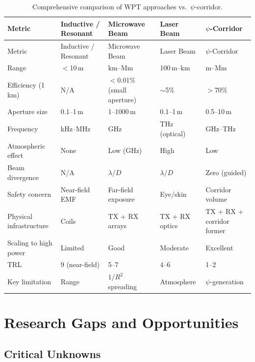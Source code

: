 \documentclass[11pt,a4paper]{article}
\begin{document}
\begin{longtable}{p{2.5cm}p{3cm}p{3cm}p{3cm}p{2cm}}
\caption{Comprehensive comparison of WPT approaches vs.\ $\psi$-corridor.} \\
\toprule
Metric & Inductive / Resonant & Microwave Beam & Laser Beam & $\psi$-Corridor \\
\midrule
\endfirsthead
\toprule
Metric & Inductive / Resonant & Microwave Beam & Laser Beam & $\psi$-Corridor \\
\midrule
\endhead
\bottomrule
\endlastfoot
Range & $<$10\,m & km--Mm & 100\,m--km & m--Mm \\
Efficiency (1\,km) & N/A & $<$0.01\% (small aperture) & $\sim$5\% & $>$70\% \\
Aperture size & 0.1--1\,m & 1--1000\,m & 0.1--1\,m & 0.5--10\,m \\
Frequency & kHz--MHz & GHz & THz (optical) & GHz--THz \\
Atmospheric effect & None & Low (GHz) & High & Low \\
Beam divergence & N/A & $\lambda/D$ & $\lambda/D$ & Zero (guided) \\
Safety concern & Near-field EMF & Far-field exposure & Eye/skin & Corridor volume \\
Physical infrastructure & Coils & TX + RX arrays & TX + RX optics & TX + RX + corridor former \\
Scaling to high power & Limited & Good & Moderate & Excellent \\
TRL & 9 (near-field) & 5--7 & 4--6 & 1--2 \\
Key limitation & Range & $1/R^2$ spreading & Atmosphere & $\psi$-generation \\
\end{longtable}

\section{Research Gaps and Opportunities}

\subsection{Critical Unknowns}
\end{document}
